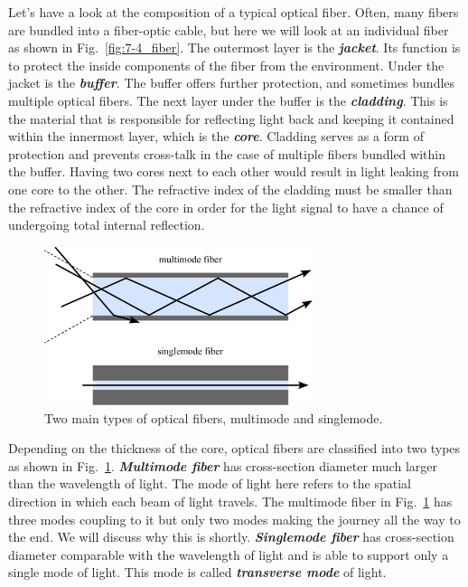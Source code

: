 Let's have a look at the composition of a typical optical fiber.
Often, many fibers are bundled into a fiber-optic cable, but here we will look at an individual fiber as shown in Fig.~\ref{fig:7-4_fiber}. 
The outermost layer is the \textit{\textbf{jacket}}.
Its function is to protect the inside components of the fiber from the environment.
Under the jacket is the \textit{\textbf{buffer}}.
The buffer offers further protection, and sometimes bundles multiple optical fibers.
The next layer under the buffer is the \textit{\textbf{cladding}}.
This is the material that is responsible for reflecting light back and keeping it contained within the innermost layer, which is the \textit{\textbf{core}}.
Cladding serves as a form of protection and prevents cross-talk in the case of multiple fibers bundled within the buffer.
Having two cores next to each other would result in light leaking from one core to the other.
The refractive index of the cladding must be smaller than the refractive index of the core in order for the light signal to have a chance of undergoing total internal reflection.

\begin{figure}[t]
    \centering
    \includegraphics[width=0.7\textwidth]{lesson7/7-4_multi_single_fiber.pdf}
    \caption[Multimode and singlemode fibers]{Two main types of optical fibers, multimode and singlemode.}
    \label{fig:7-4_multimode_singlemode_fiber}
\end{figure}

Depending on the thickness of the core, optical fibers are classified into two types as shown in Fig.~\ref{fig:7-4_multimode_singlemode_fiber}.
\textit{\textbf{Multimode fiber}} has cross-section diameter much larger than the wavelength of light.
The mode of light here refers to the spatial direction in which each beam of light travels.
The multimode fiber in Fig.~\ref{fig:7-4_multimode_singlemode_fiber} has three modes coupling to it but only two modes making the journey all the way to the end.
We will discuss why this is shortly.
\textit{\textbf{Singlemode fiber}}  has cross-section diameter comparable with the wavelength of light and is able to support only a single mode of light.
This mode is called \textit{\textbf{transverse mode}}  of light.

